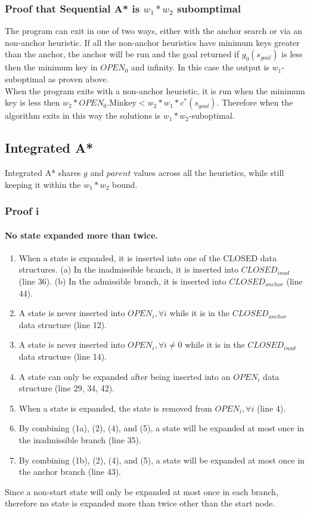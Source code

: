 \documentclass[11pt,letter]{article}
\begin{document}
\subsubsection{Proof that Sequential A* is $w_1*w_2$ subomptimal}
The program can exit in one of two ways, either with the anchor search or via an non-anchor heuristic.
If all the non-anchor heuristics have minimum keys greater than the anchor, the anchor will be run and the goal returned if $g_0(s_{goal})$ is less then the minimum key in $OPEN_0$ and infinity. In this case the output is $w_1$-suboptimal as proven above. \\

When the program exits with a non-anchor heuristic, it is run when the minimum key is less then $w_2*OPEN_0.\text{Minkey} < w_2*w_1*c^*(s_{goal})$.
Therefore when the algorithm exits in this way the solutions is $w_1*w_2$-suboptimal.

\subsection{Integrated A*}

Integrated A* shares $g$ and $parent$ values across all the heuristics, while still keeping it within the $w_1*w_2$ bound.

\subsubsection{Proof i}
\paragraph{No state expanded more than twice.}
\begin{enumerate}
    \item When a state is expanded, it is inserted into one of the CLOSED data structures. (a) In the inadmissible branch, it is inserted into $CLOSED_{inad}$ (line 36). (b) In the admissible branch, it is inserted into $CLOSED_{anchor}$ (line 44).
    \item A state is never inserted into $OPEN_i, \forall i$ while it is in the $CLOSED_{anchor}$ data structure (line 12).
    \item A state is never inserted into $OPEN_i, \forall i \neq 0$ while it is in the $CLOSED_{inad}$ data structure (line 14).
    \item A state can only be expanded after being inserted into an $OPEN_i$ data structure (line 29, 34, 42).
    \item When a state is expanded, the state is removed from $OPEN_i, \forall i$ (line 4).
    \item By combining (1a), (2), (4), and (5), a state will be expanded at most once in the inadmissible branch (line 35).
    \item By combining (1b), (2), (4), and (5), a state will be expanded at most once in the anchor branch (line 43).
\end{enumerate}
 Since a non-start state will only be expanded at most once in each branch, therefore no state is expanded more than twice other than the start node.
\end{document}
